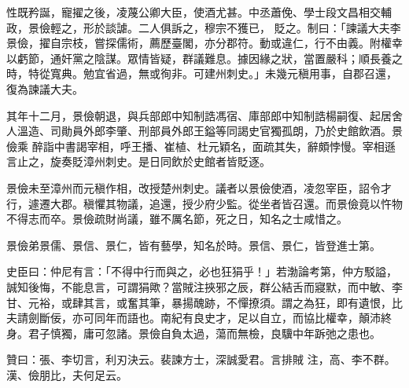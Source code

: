 \begin{pinyinscope}
 性既矜誕，寵擢之後，凌蔑公卿大臣，使酒尤甚。中丞蕭俛、學士段文昌相交輔政，景儉輕之，形於談謔。二人俱訴之，穆宗不獲已，
 貶之。制曰：「諫議大夫李景儉，擢自宗枝，嘗探儒術，薦歷臺閣，亦分郡符。動或違仁，行不由義。附權幸以虧節，通奸黨之陰謀。眾情皆疑，群議難息。據因緣之狀，當置嚴科；順長養之時，特從寬典。勉宜省過，無或徇非。可建州刺史。」未幾元稹用事，自郡召還，復為諫議大夫。



 其年十二月，景儉朝退，與兵部郎中知制誥馮宿、庫部郎中知制誥楊嗣復、起居舍人溫造、司勛員外郎李肇、刑部員外郎王鎰等同謁史官獨孤朗，乃於史館飲酒。景儉乘
 醉詣中書謁宰相，呼王播、崔植、杜元穎名，面疏其失，辭頗悖慢。宰相遜言止之，旋奏貶漳州刺史。是日同飲於史館者皆貶逐。



 景儉未至漳州而元稹作相，改授楚州刺史。議者以景儉使酒，凌忽宰臣，詔令才行，遽遷大郡。稹懼其物議，追還，授少府少監。從坐者皆召還。而景儉竟以忤物不得志而卒。景儉疏財尚議，雖不厲名節，死之日，知名之士咸惜之。



 景儉弟景儒、景信、景仁，皆有藝學，知名於時。景信、景仁，皆登進士第。



 史臣曰：仲尼有言：「不得中行而與之，必也狂狷乎！」若渤論考第，仲方駁謚，誠知後悔，不能息言，可謂狷歟？當賊注挾邪之辰，群公結舌而寢默，而中敏、李甘、元裕，或肆其言，或奮其筆，暴揚醜跡，不憚撩須。謂之為狂，即有遺恨，比夫請劍斷佞，亦可同年而語也。南紀有良史才，足以自立，而協比權幸，顛沛終身。君子慎獨，庸可忽諸。景儉自負太過，蕩而無檢，良驥中年跅弛之患也。



 贊曰：張、李切言，利刃決云。裴諫方士，深誠愛君。言排賊
 注，高、李不群。漢、儉朋比，夫何足云。



\end{pinyinscope}